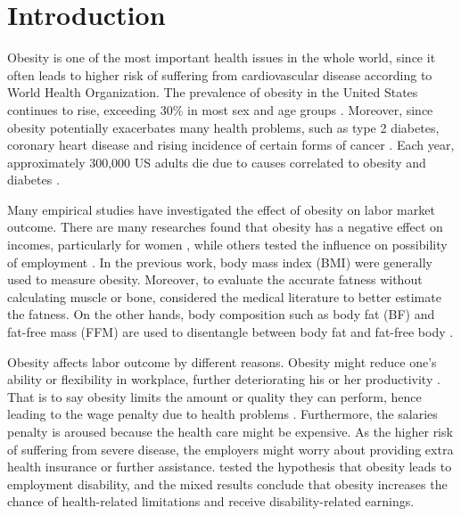 \documentclass{article}
\begin{document}
\section{Introduction}
Obesity is one of the most important health issues in the whole world, since it often leads to higher risk of suffering from cardiovascular disease according to World Health Organization. The prevalence of obesity in the United States continues to rise, exceeding 30\% in most sex and age groups \citep{flegal2010prevalence}. Moreover, since obesity potentially exacerbates many health problems, such as type 2 diabetes, coronary heart disease and rising incidence of certain forms of cancer \citep{kopelman2000obesity}. Each year, approximately 300,000 US adults die due to causes correlated to obesity and diabetes \citep{mokdad2003prevalence}.
\par
\setlength{\parindent}{2em}
Many empirical studies have investigated the effect of obesity on labor market outcome. There are many researches found that obesity has a negative effect on incomes, particularly for women \citep{pagan1997obesity,cawley2004impact,norton2008genetic}, while others tested the influence on possibility of employment \citep{garcia2007evolution,bolin2008informal,frayling2007common}. In the previous work, body mass index (BMI) were generally used to measure obesity. Moreover, to evaluate the accurate fatness without calculating muscle or bone, \citet{burkhauser2006importance} considered the medical literature to better estimate the fatness. On the other hands, body composition such as body fat (BF) and fat-free mass (FFM) are used to disentangle between body fat and fat-free body \citep{burkhauser2006importance}.
\par
\setlength{\parindent}{2em}
Obesity affects labor outcome by different reasons. Obesity might reduce one’s ability or flexibility in workplace, further deteriorating his or her productivity \citep{greve2008obesity}. That is to say obesity limits the amount or quality they can perform, hence leading to the wage penalty due to health problems \citep{baum2004wage}. Furthermore, the salaries penalty is aroused because the health care might be expensive. As the higher risk of suffering from severe disease, the employers might worry about providing extra health insurance or further assistance. \citet{burkhauser2008beyond} tested the hypothesis that obesity leads to employment disability, and the mixed results conclude that obesity increases the chance of health-related limitations and receive disability-related earnings.
\par
\end{document}
